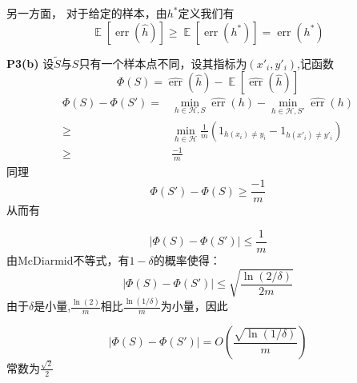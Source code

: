 \documentclass{ctexart}
\DeclareMathOperator*\E{\mathbb{E}}
\DeclareMathOperator\err{err}
\begin{document}
另一方面，
对于给定的样本，由$h^*$定义我们有
\begin{equation}
\E[\err(\hat{h})]\geq \E[\err(h^*)]=\err(h^*)
\end{equation}

\textbf{P3(b)}
设$\tilde{S}$与$S$只有一个样本点不同，设其指标为$(x'_i,y'_i)$,记函数
\begin{equation}
\Phi(S)=\widehat{\err}(\hat{h})-\E[\widehat{\err}(\hat{h})]
\end{equation}
\begin{align}
\Phi(S)-\Phi(S')=& \min_{h\in \mathcal{H},S}\widehat{\err}(h)-\min_{h\in \mathcal{H},S'}\widehat{\err}(h)\\
\geq &\min_{h\in \mathcal{H}} \frac{1}{m}(1_{h(x_i)\neq y_i}-1_{h(x'_i)\neq y'_i})\\
\geq & \frac{-1}{m}
\end{align}
同理
\begin{equation}
\Phi(S')-\Phi(S)\geq \frac{-1}{m}
\end{equation}
从而有

\begin{equation}
|\Phi(S)-\Phi(S')|\leq \frac{1}{m}
\end{equation}
由McDiarmid不等式，有$1-\delta$的概率使得：
\begin{equation}
|\Phi(S)-\Phi(S')|\leq \sqrt{\frac{\ln(2/\delta)}{2m}} 
\end{equation}
由于$\delta$是小量,$\frac{\ln(2)}{m}$相比$\frac{\ln(1/\delta)}{m}$为小量，因此

\begin{equation}
|\Phi(S)-\Phi(S')|=O(\frac{\sqrt{\ln(1/\delta)}}{m})
\end{equation}
常数为$\frac{\sqrt{2}}{2}$
\begin{equation}
\end{equation}
\end{document}
